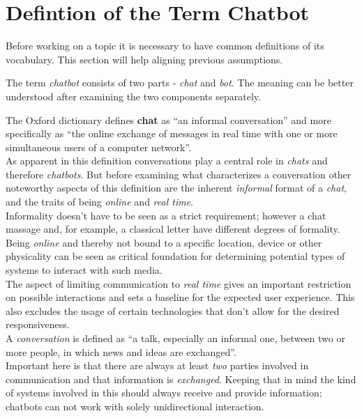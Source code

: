 \chapter{Defintion of the Term Chatbot}


Before working on a topic it is necessary to have common definitions of its vocabulary.
This section will help aligning previous assumptions.

The term \emph{chatbot} consists of two parts - \emph{chat} and \emph{bot}. The meaning can be better understood after examining the two components separately.

The Oxford dictionary defines \textbf{chat} as ``an informal conversation'' and more specifically as ``the online exchange of messages in real time with one or more simultaneous users of a computer network''\cite{oxfordchat}.
\\
As apparent in this definition conversations play a central role in \emph{chats} and therefore \emph{chatbots}.
But before examining what characterizes a conversation other noteworthy aspects of this definition are the inherent \emph{informal} format of a \emph{chat}, and the traits of being \emph{online} and \emph{real time}.
\\
Informality doesn't have to be seen as a strict requirement; however a chat massage and, for example, a classical letter have different degrees of formality.
\\
Being \emph{online} and thereby not bound to a specific location, device or other physicality can be seen as critical foundation for determining potential types of systems to interact with such media.
\\
The aspect of limiting communication to \emph{real time} gives an important restriction on possible interactions and sets a baseline for the expected user experience. This also excludes the usage of certain technologies that don't allow for the desired responsiveness.
\\
A \emph{conversation} is defined as ``a talk, especially an informal one, between two or more people, in which news and ideas are exchanged''\cite{oxfordconversation}.
\\
Important here is that there are always at least \emph{two} parties involved in communication and that information is \emph{exchanged}.
Keeping that in mind the kind of systems involved in this should always receive and provide information; chatbots can not work with solely unidirectional interaction.

